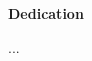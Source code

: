 \vspace*{\fill}
\begin{center}\textsf{\textbf{Dedication}}\end{center}

\noindent ...

\vspace*{\fill}